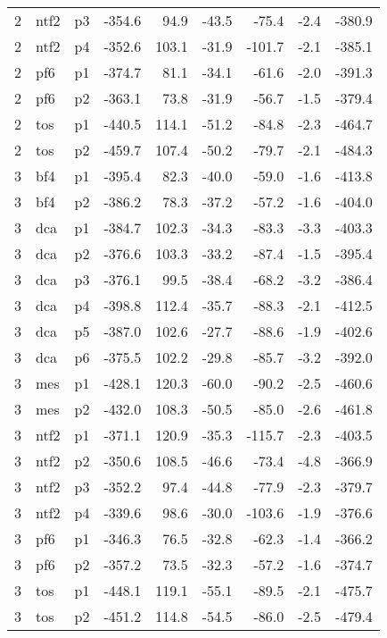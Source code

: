 \documentclass[a4paper]{article}
\begin{document}
\begin{table}[ht]
\begin{tabular}{rllrrrrrr}
   2 & ntf2 & p3 & -354.6 & 94.9 & -43.5 & -75.4 & -2.4 & -380.9 \\ 
   2 & ntf2 & p4 & -352.6 & 103.1 & -31.9 & -101.7 & -2.1 & -385.1 \\ 
   2 & pf6 & p1 & -374.7 & 81.1 & -34.1 & -61.6 & -2.0 & -391.3 \\ 
   2 & pf6 & p2 & -363.1 & 73.8 & -31.9 & -56.7 & -1.5 & -379.4 \\ 
   2 & tos & p1 & -440.5 & 114.1 & -51.2 & -84.8 & -2.3 & -464.7 \\ 
   2 & tos & p2 & -459.7 & 107.4 & -50.2 & -79.7 & -2.1 & -484.3 \\ 
   3 & bf4 & p1 & -395.4 & 82.3 & -40.0 & -59.0 & -1.6 & -413.8 \\ 
   3 & bf4 & p2 & -386.2 & 78.3 & -37.2 & -57.2 & -1.6 & -404.0 \\ 
   3 & dca & p1 & -384.7 & 102.3 & -34.3 & -83.3 & -3.3 & -403.3 \\ 
   3 & dca & p2 & -376.6 & 103.3 & -33.2 & -87.4 & -1.5 & -395.4 \\ 
   3 & dca & p3 & -376.1 & 99.5 & -38.4 & -68.2 & -3.2 & -386.4 \\ 
   3 & dca & p4 & -398.8 & 112.4 & -35.7 & -88.3 & -2.1 & -412.5 \\ 
   3 & dca & p5 & -387.0 & 102.6 & -27.7 & -88.6 & -1.9 & -402.6 \\ 
   3 & dca & p6 & -375.5 & 102.2 & -29.8 & -85.7 & -3.2 & -392.0 \\ 
   3 & mes & p1 & -428.1 & 120.3 & -60.0 & -90.2 & -2.5 & -460.6 \\ 
   3 & mes & p2 & -432.0 & 108.3 & -50.5 & -85.0 & -2.6 & -461.8 \\ 
   3 & ntf2 & p1 & -371.1 & 120.9 & -35.3 & -115.7 & -2.3 & -403.5 \\ 
   3 & ntf2 & p2 & -350.6 & 108.5 & -46.6 & -73.4 & -4.8 & -366.9 \\ 
   3 & ntf2 & p3 & -352.2 & 97.4 & -44.8 & -77.9 & -2.3 & -379.7 \\ 
   3 & ntf2 & p4 & -339.6 & 98.6 & -30.0 & -103.6 & -1.9 & -376.6 \\ 
   3 & pf6 & p1 & -346.3 & 76.5 & -32.8 & -62.3 & -1.4 & -366.2 \\ 
   3 & pf6 & p2 & -357.2 & 73.5 & -32.3 & -57.2 & -1.6 & -374.7 \\ 
   3 & tos & p1 & -448.1 & 119.1 & -55.1 & -89.5 & -2.1 & -475.7 \\ 
   3 & tos & p2 & -451.2 & 114.8 & -54.5 & -86.0 & -2.5 & -479.4 \\ 

\end{tabular}
\end{table}
\end{document}
